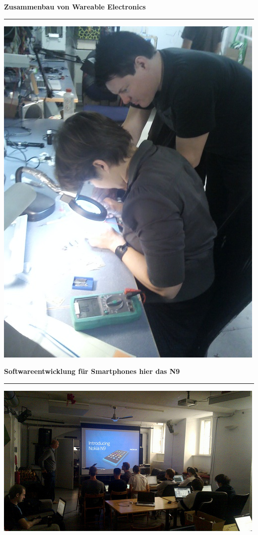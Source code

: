 \documentclass{seminar}
\providecommand{\T}[1]{
	\begin{center}
		{\bf #1}
	\end{center}
	\vspace{2mm}
	\hrule
	\vspace{2mm}
}
\begin{document}
\begin{slide}
	\T{Zusammenbau von Wareable Electronics}
	\begin{center}
		\includegraphics[scale=0.25]{assembly_of_wareable_electronics.jpeg}
	\end{center}
\end{slide}

\begin{slide}
	\T{Softwareentwicklung für Smartphones hier das N9}
	\begin{center}
		\includegraphics[scale=0.5]{n9_hackaton.jpeg}
	\end{center}
\end{slide}
\end{document}
